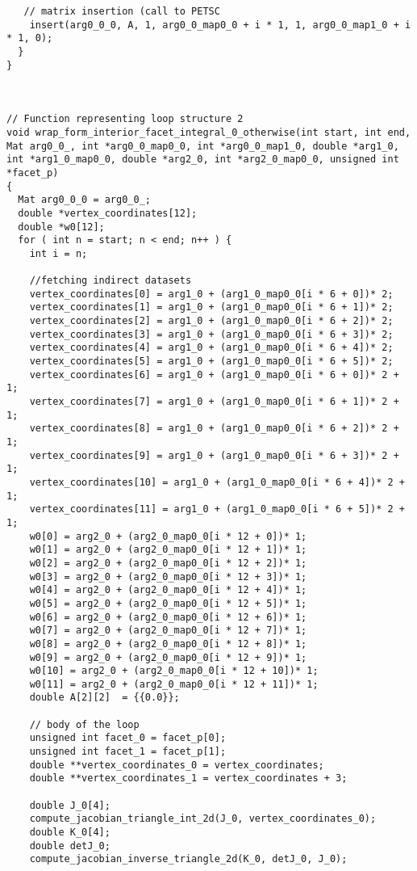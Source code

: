 \documentclass[a4paper]{article}
\begin{document}
\begin{appendices}
\begin{lstlisting}
   // matrix insertion (call to PETSC  
    insert(arg0_0_0, A, 1, arg0_0_map0_0 + i * 1, 1, arg0_0_map1_0 + i * 1, 0);
  }
}



// Function representing loop structure 2
void wrap_form_interior_facet_integral_0_otherwise(int start, int end, Mat arg0_0_, int *arg0_0_map0_0, int *arg0_0_map1_0, double *arg1_0, int *arg1_0_map0_0, double *arg2_0, int *arg2_0_map0_0, unsigned int *facet_p) 
{
  Mat arg0_0_0 = arg0_0_;
  double *vertex_coordinates[12];
  double *w0[12];
  for ( int n = start; n < end; n++ ) {
    int i = n;
    
    //fetching indirect datasets
    vertex_coordinates[0] = arg1_0 + (arg1_0_map0_0[i * 6 + 0])* 2;
    vertex_coordinates[1] = arg1_0 + (arg1_0_map0_0[i * 6 + 1])* 2;
    vertex_coordinates[2] = arg1_0 + (arg1_0_map0_0[i * 6 + 2])* 2;
    vertex_coordinates[3] = arg1_0 + (arg1_0_map0_0[i * 6 + 3])* 2;
    vertex_coordinates[4] = arg1_0 + (arg1_0_map0_0[i * 6 + 4])* 2;
    vertex_coordinates[5] = arg1_0 + (arg1_0_map0_0[i * 6 + 5])* 2;
    vertex_coordinates[6] = arg1_0 + (arg1_0_map0_0[i * 6 + 0])* 2 + 1;
    vertex_coordinates[7] = arg1_0 + (arg1_0_map0_0[i * 6 + 1])* 2 + 1;
    vertex_coordinates[8] = arg1_0 + (arg1_0_map0_0[i * 6 + 2])* 2 + 1;
    vertex_coordinates[9] = arg1_0 + (arg1_0_map0_0[i * 6 + 3])* 2 + 1;
    vertex_coordinates[10] = arg1_0 + (arg1_0_map0_0[i * 6 + 4])* 2 + 1;
    vertex_coordinates[11] = arg1_0 + (arg1_0_map0_0[i * 6 + 5])* 2 + 1;
    w0[0] = arg2_0 + (arg2_0_map0_0[i * 12 + 0])* 1;
    w0[1] = arg2_0 + (arg2_0_map0_0[i * 12 + 1])* 1;
    w0[2] = arg2_0 + (arg2_0_map0_0[i * 12 + 2])* 1;
    w0[3] = arg2_0 + (arg2_0_map0_0[i * 12 + 3])* 1;
    w0[4] = arg2_0 + (arg2_0_map0_0[i * 12 + 4])* 1;
    w0[5] = arg2_0 + (arg2_0_map0_0[i * 12 + 5])* 1;
    w0[6] = arg2_0 + (arg2_0_map0_0[i * 12 + 6])* 1;
    w0[7] = arg2_0 + (arg2_0_map0_0[i * 12 + 7])* 1;
    w0[8] = arg2_0 + (arg2_0_map0_0[i * 12 + 8])* 1;
    w0[9] = arg2_0 + (arg2_0_map0_0[i * 12 + 9])* 1;
    w0[10] = arg2_0 + (arg2_0_map0_0[i * 12 + 10])* 1;
    w0[11] = arg2_0 + (arg2_0_map0_0[i * 12 + 11])* 1;
    double A[2][2]  = {{0.0}};

    // body of the loop
    unsigned int facet_0 = facet_p[0];
    unsigned int facet_1 = facet_p[1];
    double **vertex_coordinates_0 = vertex_coordinates;
    double **vertex_coordinates_1 = vertex_coordinates + 3;

    double J_0[4];
    compute_jacobian_triangle_int_2d(J_0, vertex_coordinates_0);
    double K_0[4];
    double detJ_0;
    compute_jacobian_inverse_triangle_2d(K_0, detJ_0, J_0);


\end{lstlisting}
\end{appendices}
\end{document}
